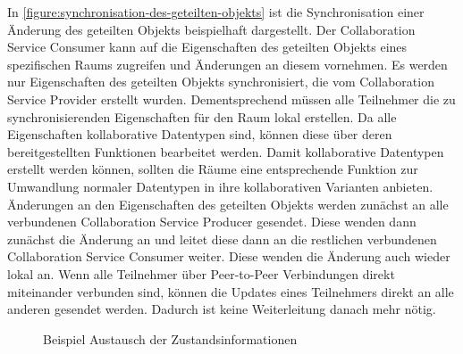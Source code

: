 In \autoref{figure:synchronisation-des-geteilten-objekts} ist die Synchronisation einer Änderung des geteilten Objekts beispielhaft dargestellt. Der Collaboration Service Consumer kann auf die Eigenschaften des geteilten Objekts eines spezifischen Raums zugreifen und Änderungen an diesem vornehmen. Es werden nur Eigenschaften des geteilten Objekts synchronisiert, die vom Collaboration Service Provider erstellt wurden. Dementsprechend müssen alle Teilnehmer die zu synchronisierenden Eigenschaften für den Raum lokal erstellen. Da alle Eigenschaften kollaborative Datentypen sind, können diese über deren bereitgestellten Funktionen bearbeitet werden. Damit kollaborative Datentypen erstellt werden können, sollten die Räume eine entsprechende Funktion zur Umwandlung normaler Datentypen in ihre kollaborativen Varianten anbieten. Änderungen an den Eigenschaften des geteilten Objekts werden zunächst an alle verbundenen Collaboration Service Producer gesendet. Diese wenden dann zunächst die Änderung an und leitet diese dann an die restlichen verbundenen Collaboration Service Consumer weiter. Diese wenden die Änderung auch wieder lokal an. Wenn alle Teilnehmer über Peer-to-Peer Verbindungen direkt miteinander verbunden sind, können die Updates eines Teilnehmers direkt an alle anderen gesendet werden. Dadurch ist keine Weiterleitung danach mehr nötig.

\begin{figure}[tbp]
    \centering

    \caption{Beispiel Austausch der Zustandsinformationen}
    \label{figure:austausch-der-zustandsinformationen}
\end{figure}

